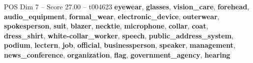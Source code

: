 \begin{textsample}{POS Dim 7 – Score 27.00 – t004623}  \label{ex:f7_pos_037}
\textbf{eyewear}, \textbf{glasses}, \textbf{vision\_care}, \textbf{forehead}, \textbf{audio\_equipment}, \textbf{formal\_wear}, \textbf{electronic\_device}, \textbf{outerwear}, \textbf{spokesperson}, \textbf{suit}, \textbf{blazer}, \textbf{necktie}, \textbf{microphone}, \textbf{collar}, \textbf{coat}, \textbf{dress\_shirt}, \textbf{white-collar\_worker}, \textbf{speech}, \textbf{public\_address\_system}, \textbf{podium}, \textbf{lectern}, \textbf{job}, \textbf{official}, \textbf{businessperson}, \textbf{speaker}, \textbf{management}, \textbf{news\_conference}, \textbf{organization}, \textbf{flag}, \textbf{government\_agency}, \textbf{hearing}

\end{textsample}
